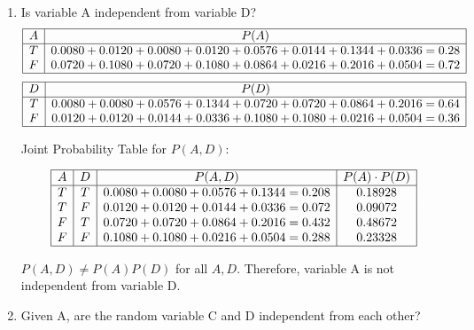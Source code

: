 \documentclass[12pt]{article}
\begin{document}
\begin{enumerate}[font=\Large,label=(\alph*)]
	\item Is variable A independent from variable D?
	      $$
		      \begin{array}{|c|c|}
			      \hline
			      A & P(A)                                                         \\
			      \hline
			      T & 0.0080+0.0120+0.0080+0.0120+0.0576+0.0144+0.1344+0.0336=0.28 \\
			      F & 0.0720+0.1080+0.0720+0.1080+0.0864+0.0216+0.2016+0.0504=0.72 \\
			      \hline
		      \end{array}
	      $$
	      $$
		      \begin{array}{|c|c|}
			      \hline
			      D & P(D)                                                         \\
			      \hline
			      T & 0.0080+0.0080+0.0576+0.1344+0.0720+0.0720+0.0864+0.2016=0.64 \\
			      F & 0.0120+0.0120+0.0144+0.0336+0.1080+0.1080+0.0216+0.0504=0.36 \\
			      \hline
		      \end{array}
	      $$

	      Joint Probability Table for $ P(A, D) $:

	      $$
		      \begin{array}{|c|c|c|c|}
			      \hline
			      A & D & P(A, D)                           & P(A)\cdot P(D) \\
			      \hline
			      T & T & 0.0080+0.0080+0.0576+0.1344=0.208 & 0.18928        \\
			      T & F & 0.0120+0.0120+0.0144+0.0336=0.072 & 0.09072        \\
			      F & T & 0.0720+0.0720+0.0864+0.2016=0.432 & 0.48672        \\
			      F & F & 0.1080+0.1080+0.0216+0.0504=0.288 & 0.23328        \\
			      \hline
		      \end{array}
	      $$

	      $ P(A, D) \neq P(A) P(D) $ for all $A,D$. Therefore, variable A is not independent from variable D.

	\item Given A, are the random variable C and D independent from each other?


\end{enumerate}
\end{document}

